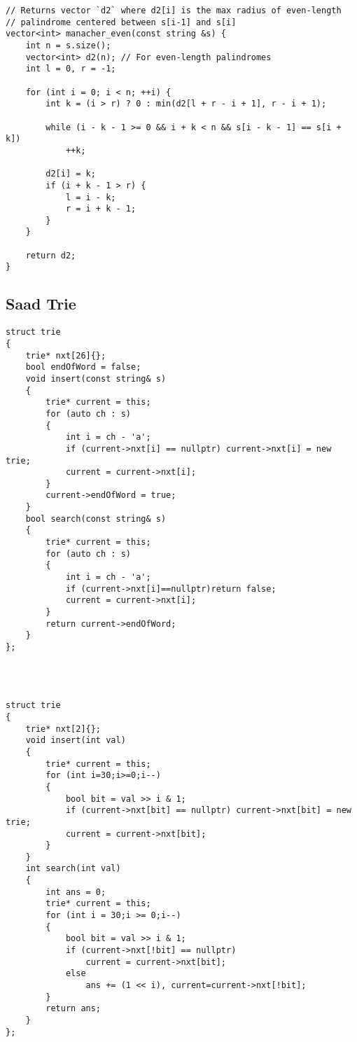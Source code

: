 \documentclass{article}
\begin{document}
{\begin{verbatim}
// Returns vector `d2` where d2[i] is the max radius of even-length
// palindrome centered between s[i-1] and s[i]
vector<int> manacher_even(const string &s) {
    int n = s.size();
    vector<int> d2(n); // For even-length palindromes
    int l = 0, r = -1;

    for (int i = 0; i < n; ++i) {
        int k = (i > r) ? 0 : min(d2[l + r - i + 1], r - i + 1);

        while (i - k - 1 >= 0 && i + k < n && s[i - k - 1] == s[i + k])
            ++k;

        d2[i] = k;
        if (i + k - 1 > r) {
            l = i - k;
            r = i + k - 1;
        }
    }

    return d2;
}
\end{verbatim}

\subsection{Saad Trie}
\begin{verbatim}
struct trie
{
    trie* nxt[26]{};
    bool endOfWord = false;
    void insert(const string& s)
    {
        trie* current = this;
        for (auto ch : s)
        {
            int i = ch - 'a';
            if (current->nxt[i] == nullptr) current->nxt[i] = new trie;
            current = current->nxt[i];
        }
        current->endOfWord = true;
    }
    bool search(const string& s)
    {
        trie* current = this;
        for (auto ch : s)
        {
            int i = ch - 'a';
            if (current->nxt[i]==nullptr)return false;
            current = current->nxt[i];
        }
        return current->endOfWord;
    }
};




struct trie
{
    trie* nxt[2]{};
    void insert(int val)
    {
        trie* current = this;
        for (int i=30;i>=0;i--)
        {
            bool bit = val >> i & 1;
            if (current->nxt[bit] == nullptr) current->nxt[bit] = new trie;
            current = current->nxt[bit];
        }
    }
    int search(int val)
    {
        int ans = 0;
        trie* current = this;
        for (int i = 30;i >= 0;i--)
        {
            bool bit = val >> i & 1;
            if (current->nxt[!bit] == nullptr)
                current = current->nxt[bit];
            else
                ans += (1 << i), current=current->nxt[!bit];
        }
        return ans;
    }
};

\end{verbatim}

}
\end{document}
